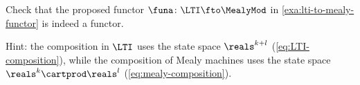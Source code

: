 \begin{gradedexercise}
    \label{ex:LTIToMealyFunctor}
    Check that the proposed functor $\funa \colon \LTI \fto \MealyMod$ in \cref{exa:lti-to-mealy-functor} is indeed a functor.

    Hint: the composition in $\LTI$ uses the state space $\reals^{k+l}$ (\cref{eq:LTI-composition}), while the composition of Mealy machines uses the state space $\reals^k \cartprod \reals^l$ (\cref{eq:mealy-composition}).
\end{gradedexercise}




